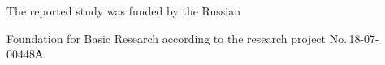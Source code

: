    




   


   


   


   












\Ack


\noindent


The reported study was funded by the Russian


Foundation for Basic Research according to the research project No.\,18-07-00448А.


 








\renewcommand{\bibname}{\protect\rmfamily References}







